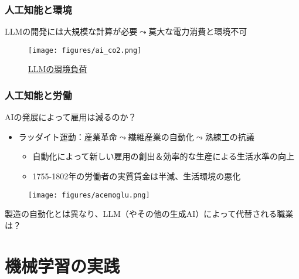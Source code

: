 \documentclass[
  xelatex,
  ja=standard]{bxjsarticle}
\providecommand{\tightlist}{%
  \setlength{\itemsep}{0pt}\setlength{\parskip}{0pt}}\usepackage{longtable,booktabs,array}
\begin{document}
\hypertarget{ux4ebaux5de5ux77e5ux80fdux3068ux74b0ux5883}{%
\subsubsection{人工知能と環境}\label{ux4ebaux5de5ux77e5ux80fdux3068ux74b0ux5883}}

LLMの開発には大規模な計算が必要\(\leadsto\)莫大な電力消費と環境不可

\begin{figure}[htpb]

{\centering \texttt{[image: figures/ai\_co2.png]}

}

\caption{\href{https://www.gizmodo.jp/2023/04/chatgpt-ai-openai-carbon-emissions-stanford-report.html}{LLMの環境負荷}}

\end{figure}

\hypertarget{ux4ebaux5de5ux77e5ux80fdux3068ux52b4ux50cd}{%
\subsubsection{人工知能と労働}\label{ux4ebaux5de5ux77e5ux80fdux3068ux52b4ux50cd}}

AIの発展によって雇用は減るのか？

\begin{itemize}
\tightlist
\item
  ラッダイト運動：産業革命\(\leadsto\)繊維産業の自動化\(\leadsto\)熟練工の抗議

  \begin{itemize}
  \tightlist
  \item
    自動化によって新しい雇用の創出＆効率的な生産による生活水準の向上
  \item
    1755-1802年の労働者の実質賃金は半減、生活環境の悪化
  \end{itemize}
\end{itemize}

\begin{figure}[htpb]

{\centering \texttt{[image: figures/acemoglu.png]}

}

\caption{\citet{acemoglu2020}}

\end{figure}

製造の自動化とは異なり、LLM（やその他の生成AI）によって代替される職業は？\citep{eloundou2023}

\hypertarget{ux6a5fux68b0ux5b66ux7fd2ux306eux5b9fux8df5}{%
\section{機械学習の実践}\label{ux6a5fux68b0ux5b66ux7fd2ux306eux5b9fux8df5}}
\end{document}
